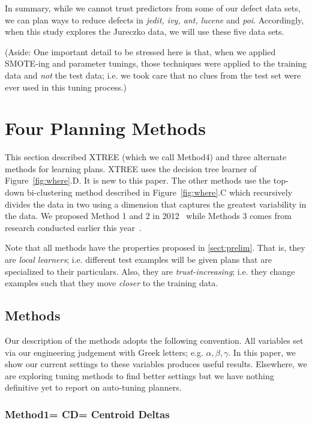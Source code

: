 \documentclass{sig-alternate}
\newcommand{\tion}[1]{\textsection\ref{sect:#1}}
\newcommand{\fig}[1]{Figure~\ref{fig:#1}}
\begin{document}
In summary, while we cannot trust predictors from some of our defect data sets,
we can plan ways to reduce defects in {\em jedit, ivy, ant, lucene} and {\em poi}.
Accordingly, when this study explores the Jureczko data, we will use these five data sets.

(Aside: One important detail to be stressed here is that, when we applied    SMOTE-ing and
parameter tunings, those techniques were applied to the training data and {\em not}
the test data; i.e. we took care that no clues from the test set were ever used in this tuning process.)



 
\section{Four Planning Methods}\label{sect:planners}
 
This section described XTREE (which we call Method4) and  three  
alternate methods for learning plans.
  XTREE  uses the decision tree learner of \fig{where}.D.  It is new to this paper.
  The other methods use the   top-down
	bi-clustering method described in \fig{where}.C  which recursively divides the
	data in two  using a dimension that captures the greatest variability in the data. 
	We proposed Method 1 and 2   in 2012~\cite{me12c} while Methods 3 comes from research conducted earlier this year~\cite{krishna15}.
 
 
  Note that all   methods have the  properties proposed in \tion{prelim}.
  That is, they are {\em local learners}; i.e. different test examples
  will be given plans that are specialized  to their particulars. Also,
  they  are {\em trust-increasing}; 
  i.e. they change  examples such that they move {\em closer} to the training data.
 

 \subsection{  Methods}

Our  description of the methods adopts the following convention. All variables
  set via  our engineering judgement  with Greek letters; e.g. $\alpha,\beta,\gamma$.
  In this paper, we show our current settings to these variables produces useful
  results. Elsewhere\cite{krall14,fu:ase15}, we are exploring tuning methods to 
  find better settings but  we have nothing definitive yet to report
  on auto-tuning planners.

\subsubsection{Method1= CD=   Centroid Deltas}
\end{document}
